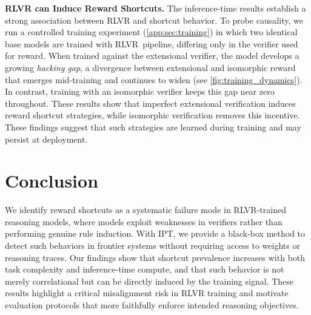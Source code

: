 \documentclass{article}
\begin{document}
\textbf{RLVR can Induce Reward Shortcuts.}
The inference-time results establish a strong association between RLVR and shortcut behavior. To probe causality, we run a controlled training experiment (\autoref{app:sec:training}) in which two identical base models are trained with \cite{olmo2025olmo3} \mbox{RLVR pipeline}, differing only in the verifier used for reward. When trained against the extensional verifier, the model develops a growing \emph{hacking gap}, a divergence between extensional and isomorphic reward that emerges mid-training and continues to widen (see \autoref{fig:training_dynamics}). In contrast, training with an isomorphic verifier keeps this gap near zero throughout. These results show that imperfect extensional verification induces reward shortcut strategies, while isomorphic verification removes this incentive. These findings suggest that such strategies are learned during training and may persist at deployment.

\section{Conclusion}
We identify reward shortcuts as a systematic failure mode in RLVR-trained reasoning models, where models exploit weaknesses in verifiers rather than performing genuine rule induction. With IPT, we provide a black-box method to detect such behaviors in frontier systems without requiring access to weights or reasoning traces. Our findings show that shortcut prevalence increases with both task complexity and inference-time compute, and that such behavior is not merely correlational but can be directly induced by the training signal. These results highlight a critical misalignment risk in RLVR training and motivate evaluation protocols that more faithfully enforce intended reasoning objectives.
\end{document}
